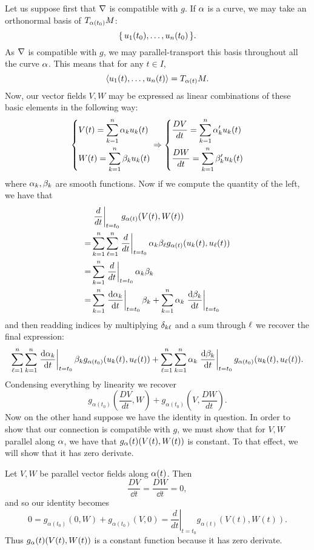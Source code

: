 \documentclass[12pt]{memoir}
\begin{document}
\begin{ptcbr}
Let us suppose first that $\nabla$ is compatible with $g$. If $\alpha$ is a curve, we may take an orthonormal basis of $T_{\alpha(t_0)}M$:
$$\{\,u_1(t_0),\dots,u_n(t_0)\,\}.$$
As $\nabla$ is compatible with $g$, we may parallel-transport this basis throughout all the curve $\alpha$. This means that for any $t\in I$, 
$$\left\langle u_1(t),\dots,u_n(t)\right\rangle=T_{\alpha(t)}M.$$
Now, our vector fields $V,W$ may be expressed as linear combinations of these basic elements in the following way:
$$
\left\lbrace
\begin{aligned}
	&V(t)=\sum_{k=1}^n\alpha_ku_k(t)\\
	&W(t)=\sum_{k=1}^n\beta_ku_k(t)
\end{aligned}
\right.\Rightarrow
\left\lbrace
\begin{aligned}
	&\frac{DV}{dt}=\sum_{k=1}^n\alpha_k'u_k(t)\\
	&\frac{DW}{dt}=\sum_{k=1}^n\beta_k'u_k(t)
\end{aligned}
\right.
$$
where $\alpha_k,\beta_k$ are smooth functions. Now if we compute the quantity of the left, we have that 
\begin{align*}
	&\left.\frac{d}{dt}\right|_{t=t_0} g_{\alpha(t)}(V(t),W(t))\\
	=&\sum_{k=1}^{n}\sum_{\ell=1}^{n}\left.\frac{d}{dt}\right|_{t=t_0}\alpha_k\beta_\ell g_{\alpha(t)}(u_k(t),u_\ell(t))\\
	=&\sum_{k=1}^{n}\left.\frac{d}{dt}\right|_{t=t_0}\alpha_k\beta_k\\
	=&\sum_{k=1}^{n}\left.\dv{\alpha_k}{t}\right|_{t=t_0}\beta_k+\sum_{k=1}^{n}\alpha_k\left.\dv{\beta_k}{t}\right|_{t=t_0}\\
\end{align*}
and then readding indices by multiplying $\delta_{k\ell}$ and a sum through $\ell$ we recover the final expression:
$$\sum_{\ell=1}^n\sum_{k=1}^{n}\left.\dv{\alpha_k}{t}\right|_{t=t_0}\beta_kg_{\alpha(t_0)}(u_k(t),u_\ell(t))+\sum_{\ell=1}^n\sum_{k=1}^{n}\alpha_k\left.\dv{\beta_k}{t}\right|_{t=t_0}g_{\alpha(t_0)}(u_k(t),u_\ell(t)).$$
Condensing everything by linearity we recover
$$g_{\alpha(t_0)} \left(\frac{DV}{dt},W\right) + g_{\alpha(t_0)} \left(V,\frac{DW}{dt}\right).$$
Now on the other hand suppose we have the identity in question. In order to show that our connection is compatible with $g$, we must show that for $V,W$ parallel along $\alpha$, we have that $g_\alpha(t)(V(t),W(t))$ is constant. To that effect, we will show that it has zero derivate.\par
Let $V,W$ be parallel vector fields along $\alpha(t)$. Then 
$$\frac{DV}{\dd t}=\frac{DW}{\dd t}=0,$$
and so our identity becomes
$$ 0=g_{\alpha(t_0)} \left(0,W\right) + g_{\alpha(t_0)} \left(V,0\right)=\left.\frac{d}{dt}\right|_{t=t_0} g_{\alpha(t)}(V(t),W(t)).$$
Thus $g_\alpha(t)(V(t),W(t))$ is a constant function because it has zero derivate.
\end{ptcbr}
\end{document}
